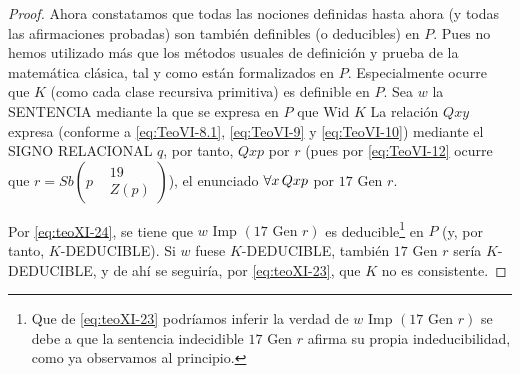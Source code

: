 \begin{proof}
    Ahora constatamos que todas las nociones definidas hasta ahora (y todas las afirmaciones probadas) son también definibles (o deducibles) en $P$. Pues no hemos utilizado más que los 
    métodos usuales de definición y prueba de la matemática clásica, tal y como están formalizados en $P$. Especialmente ocurre que $K$ (como cada clase recursiva primitiva) es definible en $P$. 
    Sea $w$ la SENTENCIA mediante la que se expresa en $P$ que $\text{Wid } K$ La relación $Qxy$ expresa (conforme a \eqref{eq:TeoVI-8.1}, \eqref{eq:TeoVI-9} y \eqref{eq:TeoVI-10}) mediante 
    el SIGNO RELACIONAL $q$, por tanto, $Qxp$ por $r$ (pues por \eqref{eq:TeoVI-12} ocurre que 
    $r = Sb\left(p
    \begin{aligned}
        &19 \\
        &Z(p)
    \end{aligned}
    \right)$), el enunciado $\forall x \thinspace Qxp$ por $17 \text{ Gen } r$.

    Por \eqref{eq:teoXI-24}, se tiene que $w \text{ Imp } (17 \text{ Gen } r)$ es deducible\footnote{Que de \eqref{eq:teoXI-23} podríamos inferir la verdad de $w \text{ Imp } (17 \text{ Gen } r)$ 
    se debe a que la sentencia indecidible $17 \text{ Gen } r$ afirma su propia indeducibilidad, como ya observamos al principio.} en $P$ (y, por tanto, $K$-DEDUCIBLE). Si $w$ fuese $K$-DEDUCIBLE,
    también $17 \text{ Gen } r$ sería $K$-DEDUCIBLE, y de ahí se seguiría, por \eqref{eq:teoXI-23}, que $K$ no es consistente.
\end{proof}
\endinput

